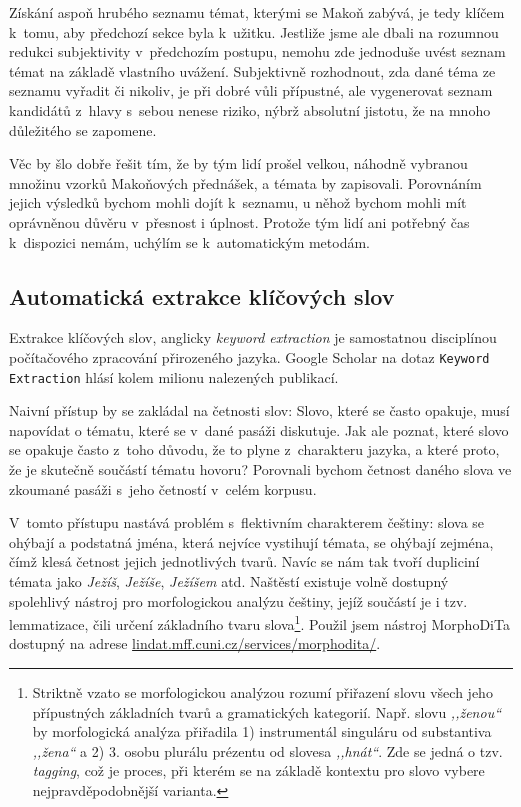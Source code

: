 Získání aspoň hrubého seznamu témat, kterými se Makoň zabývá, je tedy klíčem
k~tomu, aby předchozí sekce byla k~užitku. Jestliže jsme ale dbali na rozumnou
redukci subjektivity v~předchozím postupu, nemohu zde jednoduše uvést seznam
témat na základě vlastního uvážení. Subjektivně rozhodnout, zda dané téma ze
seznamu vyřadit či nikoliv, je při dobré vůli přípustné, ale vygenerovat seznam
kandidátů z~hlavy s~sebou nenese riziko, nýbrž absolutní jistotu, že na mnoho
důležitého se zapomene.

Věc by šlo dobře řešit tím, že by tým lidí prošel velkou, náhodně vybranou
množinu vzorků Makoňových přednášek, a témata by zapisovali. Porovnáním jejich
výsledků bychom mohli dojít k~seznamu, u něhož bychom mohli mít oprávněnou důvěru
v~přesnost i úplnost. Protože tým lidí ani potřebný čas k~dispozici nemám,
uchýlím se k~automatickým metodám.

\subsection{Automatická extrakce klíčových slov}
\label{kap:keywords}

Extrakce klíčových slov, anglicky \textit{keyword extraction} je samostatnou
disciplínou počítačového zpracování přirozeného jazyka. Google Scholar na dotaz
\texttt{Keyword Extraction} hlásí kolem milionu nalezených publikací.

Naivní přístup by se zakládal na četnosti slov: Slovo, které se často opakuje,
musí napovídat o tématu, které se v~dané pasáži diskutuje. Jak ale poznat, které
slovo se opakuje často z~toho důvodu, že to plyne z~charakteru jazyka, a které
proto, že je skutečně součástí tématu hovoru? Porovnali bychom četnost daného
slova ve zkoumané pasáži s~jeho četností v~celém korpusu.

V~tomto přístupu nastává problém s~flektivním charakterem češtiny: slova se
ohýbají a podstatná jména, která nejvíce vystihují témata, se ohýbají zejména,
čímž klesá četnost jejich jednotlivých tvarů. Navíc se nám tak tvoří dupliciní
témata jako \textit{Ježíš}, \textit{Ježíše}, \textit{Ježíšem} atd. Naštěstí existuje volně
dostupný spolehlivý nástroj pro morfologickou analýzu češtiny, jejíž součástí je
i tzv. lemmatizace, čili určení základního tvaru slova\footnote{Striktně vzato
se morfologickou analýzou rozumí přiřazení slovu všech jeho přípustných
základních tvarů a gramatických kategorií. Např. slovu \textit{,,ženou``} by
morfologická analýza přiřadila 1) instrumentál singuláru od substantiva
\textit{,,žena``} a 2) 3. osobu plurálu prézentu od slovesa \textit{,,hnát``}.
Zde se jedná o tzv. \textit{tagging}, což je proces, při kterém se na základě
kontextu pro slovo vybere nejpravděpodobnější varianta.}. Použil jsem nástroj
MorphoDiTa\cite{morphodita} dostupný na adrese
\href{http://lindat.mff.cuni.cz/services/morphodita/}{lindat.mff.cuni.cz/services/morphodita/}.

